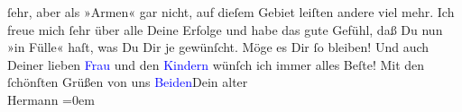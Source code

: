                ſehr, aber als »Armen« gar nicht, auf dieſem Gebiet leiſten andere viel mehr.\pend
           \pstart
           Ich freue mich ſehr über alle Deine Erfolge und habe das gute Gefühl, daß Du nun »in
               Fülle« haſt, was Du Dir je gewünſcht. Möge es Dir ſo bleiben! Und auch Deiner lieben
                  \textcolor{blue}{Frau}{} und den \textcolor{blue}{Kindern}{}\ledrightnote{\textcolor{blue}{Heinrich Schnitzler}{\newline}\textcolor{blue}{Lili Schnitzler}} wünſch ich immer alles Beſte!\pend
           \pstart
           Mit den ſchönſten Grüßen von uns \textcolor{blue}{Beiden}{}Dein alter{\\[\baselineskip]}\spacefill\mbox{Hermann}\pend
           \leftskip=0em{}\endnumbering{}  
      